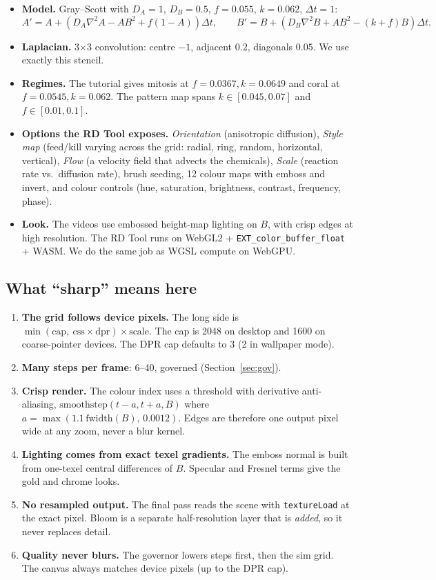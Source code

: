 \documentclass[10pt,a4paper]{article}
\newcommand{\code}[1]{\texttt{\small #1}}
\begin{document}
\begin{itemize}
\item \textbf{Model.} Gray--Scott with $D_A=1$, $D_B=0.5$, $f=0.055$, $k=0.062$, $\Delta t=1$:
\[
A' = A + (D_A\nabla^2 A - AB^2 + f(1-A))\Delta t,\qquad
B' = B + (D_B\nabla^2 B + AB^2 - (k+f)B)\Delta t .
\]
\item \textbf{Laplacian.} 3$\times$3 convolution: centre $-1$, adjacent $0.2$, diagonals $0.05$.
We use exactly this stencil.
\item \textbf{Regimes.} The tutorial gives mitosis at $f=0.0367,k=0.0649$ and coral at
$f=0.0545,k=0.062$. The pattern map spans $k\in[0.045,0.07]$ and $f\in[0.01,0.1]$.
\item \textbf{Options the RD Tool exposes.} \emph{Orientation} (anisotropic diffusion),
\emph{Style map} (feed/kill varying across the grid: radial, ring, random, horizontal, vertical),
\emph{Flow} (a velocity field that advects the chemicals), \emph{Scale} (reaction rate vs.\ diffusion
rate), brush seeding, 12 colour maps with emboss and invert, and colour controls (hue, saturation,
brightness, contrast, frequency, phase).
\item \textbf{Look.} The videos use embossed height-map lighting on $B$, with crisp edges at high
resolution. The RD Tool runs on WebGL2 + \code{EXT\_color\_buffer\_float} + WASM. We do the same
job as WGSL compute on WebGPU.
\end{itemize}

\subsection{What ``sharp'' means here}
\begin{enumerate}
\item \textbf{The grid follows device pixels.} The long side is $\min(\text{cap},\ \text{css}\times\text{dpr})\times\text{scale}$.
The cap is 2048 on desktop and 1600 on coarse-pointer devices. The DPR cap defaults to 3 (2 in wallpaper mode).
\item \textbf{Many steps per frame}: 6--40, governed (Section~\ref{sec:gov}).
\item \textbf{Crisp render.} The colour index uses a threshold with derivative anti-aliasing,
$\mathrm{smoothstep}(t-a,t+a,B)$ where $a=\max(1.1\,\mathrm{fwidth}(B),\,0.0012)$. Edges are therefore
one output pixel wide at any zoom, never a blur kernel.
\item \textbf{Lighting comes from exact texel gradients.} The emboss normal is built from one-texel central
differences of $B$. Specular and Fresnel terms give the gold and chrome looks.
\item \textbf{No resampled output.} The final pass reads the scene with \code{textureLoad} at the exact pixel.
Bloom is a separate half-resolution layer that is \emph{added}, so it never replaces detail.
\item \textbf{Quality never blurs.} The governor lowers steps first, then the sim grid. The canvas
always matches device pixels (up to the DPR cap).
\end{enumerate}
\end{document}
